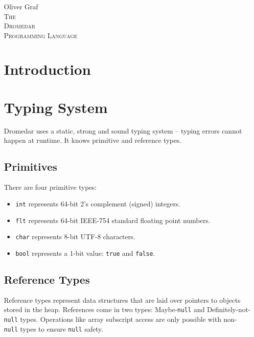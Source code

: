 \documentclass{article}
\newcommand{\code}[1]{\lstinline[columns=fixed]{#1}}
\begin{document}
	
	\vfill
	\begin{center}
		\large{Oliver Graf}\\
		\vspace{5cm}
		\large{\textsc{The}}\\\vspace{1cm}
		\Huge{\textsc{Dromedar}}\\\vspace{1cm}
		\large{\textsc{Programming Language}}
	\end{center}
	\vfill
	
	\clearpage
	
	\setcounter{tocdepth}{1}
	\tableofcontents
	\clearpage
	
	\section{Introduction}
	
	\section{Typing System}
	
		Dromedar uses a static, strong and sound typing system -- typing errors cannot happen at runtime. It knows primitive and reference types.
		
		\subsection{Primitives}
		
			There are four primitive types:
			
			\begin{itemize}
				\item \code{int} represents 64-bit 2's complement (signed) integers.
				\item \code{flt} represents 64-bit IEEE-754 standard floating point numbers.
				\item \code{char} represents 8-bit UTF-8 characters.
				\item \code{bool} represents a 1-bit value: \code{true} and \code{false}.
			\end{itemize}
		
		\subsection{Reference Types}
		
			Reference types represent data structures that are laid over pointers to objects stored in the heap. References come in two types: Maybe-\code{null} and Definitely-not-\code{null} types. Operations like array subscript access are only possible with non-\code{null} types to ensure \code{null} safety.
			
\end{document}

